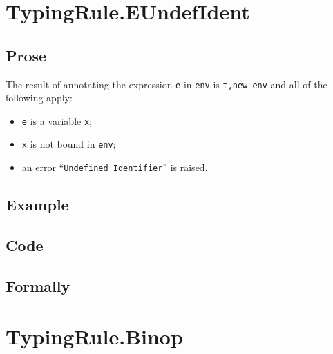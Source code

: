 \documentclass{book}
\begin{document}

\section{TypingRule.EUndefIdent \label{sec:TypingRule.EUndefIdent}}

  \subsection{Prose}
  The result of annotating the expression \texttt{e} in \texttt{env} is
\texttt{t,new\_env} and all of the following apply:
  \begin{itemize}
  \item \texttt{e} is a variable \texttt{x};
  \item \texttt{x} is not bound in \texttt{env};
  \item an error ``\texttt{Undefined Identifier}'' is raised.
  \end{itemize}

  \subsection{Example}

  \subsection{Code}

\begin{emptyformal}
  \subsection{Formally}
\end{emptyformal}


\section{TypingRule.Binop \label{sec:TypingRule.Binop}}
\end{document}
